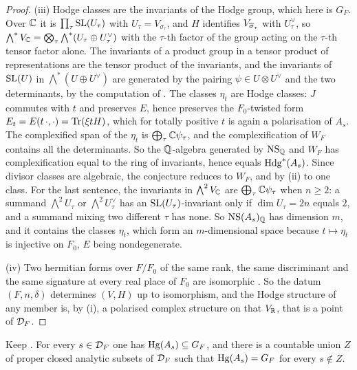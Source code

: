 \begin{proof}
(iii) Hodge classes are the invariants of the Hodge group, which here is
$G_{F}$. Over $\mathbb{C}$ it is $\prod_{\tau}\operatorname{SL}(U_{\tau})$ with
$U_{\tau}=V_{\sigma_{\tau}}$, and
$H$ identifies $V_{\overline{\sigma}_{\tau}}$ with $U_{\tau}^{\vee}$, so
$\bigwedge^{*}V_{\mathbb{C}}=\bigotimes_{\tau}\bigwedge^{*}(U_{\tau}\oplus U_{\tau}^{\vee})$
with the $\tau$-th factor of the group acting on the $\tau$-th tensor factor
alone. The invariants of a product group in a tensor product of
representations are the tensor product of the invariants, and the invariants
of $\operatorname{SL}(U)$ in $\bigwedge^{*}(U\oplus U^{\vee})$ are generated by the pairing
$\psi\in U\otimes U^{\vee}$ and the two determinants, by the computation of
. The classes $\eta_{t}$ are Hodge classes: $J$ commutes
with $t$ and preserves $E$, hence preserves the $F_{0}$-twisted form
$E_{t}=E(t\,\cdot,\cdot)=\operatorname{Tr}(\xi tH)$, which for totally positive $t$ is again
a polarisation of $A_{s}$. The complexified span of the $\eta_{t}$ is
$\bigoplus_{\tau}\mathbb{C}\psi_{\tau}$, and the complexification of $W_{F}$
contains all the determinants. So the $\mathbb{Q}$-algebra generated by $\mathrm{NS}_{\mathbb{Q}}$
and $W_{F}$ has complexification equal to the ring of invariants, hence
equals $\mathrm{Hdg}^{*}(A_{s})$. Since divisor classes are algebraic, the conjecture
reduces to $W_{F}$, and by (ii) to one class. For the last sentence, the
invariants in $\bigwedge^{2}V_{\mathbb{C}}$ are $\bigoplus_{\tau}\mathbb{C}\psi_{\tau}$ when
$n\ge2$: a summand $\bigwedge^{2}U_{\tau}$ or $\bigwedge^{2}U_{\tau}^{\vee}$
has an $\operatorname{SL}(U_{\tau})$-invariant only if $\dim U_{\tau}=2n$ equals $2$, and a
summand mixing two different $\tau$ has none. So $\mathrm{NS}(A_{s})_{\mathbb{Q}}$ has
dimension $m$, and it contains the classes $\eta_{t}$, which form an
$m$-dimensional space because $t\mapsto\eta_{t}$ is injective on $F_{0}$, $E$
being nondegenerate.

(iv) Two hermitian forms over $F/F_{0}$ of the same rank, the same
discriminant and the same signature at every real place of $F_{0}$ are
isomorphic \cite[Ch.~10, \S6]{Sch85}. So the datum $(F,n,\delta)$ determines
$(V,H)$ up to isomorphism, and the Hodge structure of any member is, by (i), a
polarised complex structure on that $V_{\mathbb{R}}$, that is a point of $\mathcal{D}_{F}$.
\end{proof}

\begin{lemma}\label{lem:cmgeneric}
Keep . For every $s\in\mathcal{D}_{F}$ one has
$\operatorname{Hg}(A_{s})\subseteq G_{F}$, and there is a countable union $Z$ of proper
closed analytic subsets of $\mathcal{D}_{F}$ such that $\operatorname{Hg}(A_{s})=G_{F}$ for every
$s\notin Z$.
\end{lemma}

